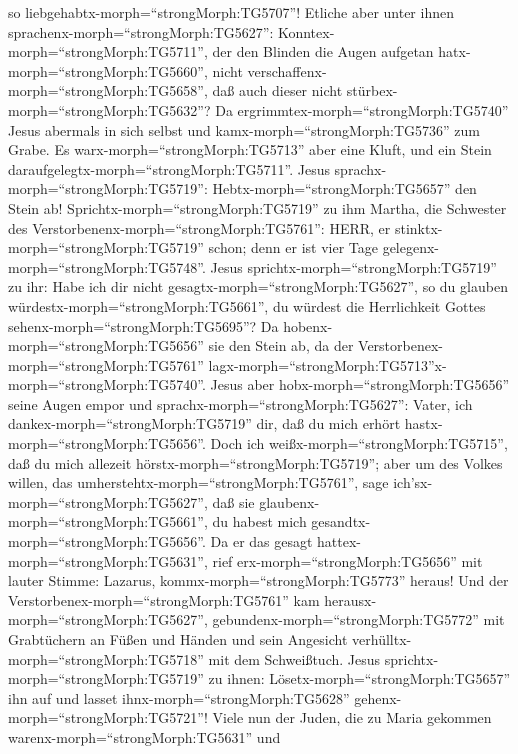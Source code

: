 so liebgehabtx-morph=``strongMorph:TG5707''!  Etliche aber
unter ihnen sprachenx-morph=``strongMorph:TG5627'':
Konntex-morph=``strongMorph:TG5711'', der den Blinden die Augen aufgetan
hatx-morph=``strongMorph:TG5660'', nicht
verschaffenx-morph=``strongMorph:TG5658'', daß auch dieser nicht
stürbex-morph=``strongMorph:TG5632''?  Da
ergrimmtex-morph=``strongMorph:TG5740'' Jesus abermals in sich selbst
und kamx-morph=``strongMorph:TG5736'' zum Grabe. Es
warx-morph=``strongMorph:TG5713'' aber eine Kluft, und ein Stein
daraufgelegtx-morph=``strongMorph:TG5711''.  Jesus
sprachx-morph=``strongMorph:TG5719'': Hebtx-morph=``strongMorph:TG5657''
den Stein ab! Sprichtx-morph=``strongMorph:TG5719'' zu ihm Martha, die
Schwester des Verstorbenenx-morph=``strongMorph:TG5761'': HERR, er
stinktx-morph=``strongMorph:TG5719'' schon; denn er ist vier Tage
gelegenx-morph=``strongMorph:TG5748''.  Jesus
sprichtx-morph=``strongMorph:TG5719'' zu ihr: Habe ich dir nicht
gesagtx-morph=``strongMorph:TG5627'', so du glauben
würdestx-morph=``strongMorph:TG5661'', du würdest die Herrlichkeit
Gottes sehenx-morph=``strongMorph:TG5695''?  Da
hobenx-morph=``strongMorph:TG5656'' sie den Stein ab, da der
Verstorbenex-morph=``strongMorph:TG5761''
lagx-morph=``strongMorph:TG5713''x-morph=``strongMorph:TG5740''. Jesus
aber hobx-morph=``strongMorph:TG5656'' seine Augen empor und
sprachx-morph=``strongMorph:TG5627'': Vater, ich
dankex-morph=``strongMorph:TG5719'' dir, daß du mich erhört
hastx-morph=``strongMorph:TG5656''.  Doch ich
weißx-morph=``strongMorph:TG5715'', daß du mich allezeit
hörstx-morph=``strongMorph:TG5719''; aber um des Volkes willen, das
umherstehtx-morph=``strongMorph:TG5761'', sage
ich'sx-morph=``strongMorph:TG5627'', daß sie
glaubenx-morph=``strongMorph:TG5661'', du habest mich
gesandtx-morph=``strongMorph:TG5656''.  Da er das gesagt
hattex-morph=``strongMorph:TG5631'', rief
erx-morph=``strongMorph:TG5656'' mit lauter Stimme: Lazarus,
kommx-morph=``strongMorph:TG5773'' heraus!  Und der
Verstorbenex-morph=``strongMorph:TG5761'' kam
herausx-morph=``strongMorph:TG5627'',
gebundenx-morph=``strongMorph:TG5772'' mit Grabtüchern an Füßen und
Händen und sein Angesicht verhülltx-morph=``strongMorph:TG5718'' mit dem
Schweißtuch. Jesus sprichtx-morph=``strongMorph:TG5719'' zu ihnen:
Lösetx-morph=``strongMorph:TG5657'' ihn auf und lasset
ihnx-morph=``strongMorph:TG5628'' gehenx-morph=``strongMorph:TG5721''!
 Viele nun der Juden, die zu Maria gekommen
warenx-morph=``strongMorph:TG5631'' und
